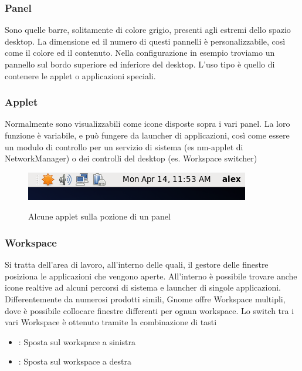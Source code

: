\subsubsection{Panel}
Sono quelle barre, solitamente di colore grigio, presenti agli estremi dello spazio desktop. La dimensione ed il numero di questi pannelli è personalizzabile, così come il colore ed il contenuto. Nella configurazione in esempio troviamo un pannello sul bordo superiore ed inferiore del desktop. L'uso tipo è quello di contenere le applet o applicazioni speciali.
\subsubsection{Applet}
Normalmente sono visualizzabili come icone disposte sopra i vari panel. La loro funzione è variabile, e può fungere da launcher di applicazioni, così come essere un modulo di controllo per un servizio di sistema (es nm-applet di NetworkManager) o dei controlli del desktop (es. Workspace switcher)
\begin{figure}[!ht]
\centering
 \includegraphics{Immagini/UI_Panel1.png}
 \label{fig:Panel Gnome}
 \caption{Alcune applet sulla pozione di un panel}
\end{figure}


\subsubsection{Workspace}
Si tratta dell'area di lavoro, all'interno delle quali, il gestore delle finestre posiziona le applicazioni che vengono aperte. All'interno è possibile trovare anche icone realtive ad alcuni percorsi di sistema e launcher di singole applicazioni. Differentemente da numerosi prodotti simili, Gnome offre Workspace multipli, dove è possibile collocare finestre differenti per ognun workspace. Lo switch tra i vari Workspace è ottenuto tramite la combinazione di tasti

\begin{itemize}
 \item {}: Sposta sul workspace a sinistra
 \item {}: Sposta sul workspace a destra
\end{itemize}



